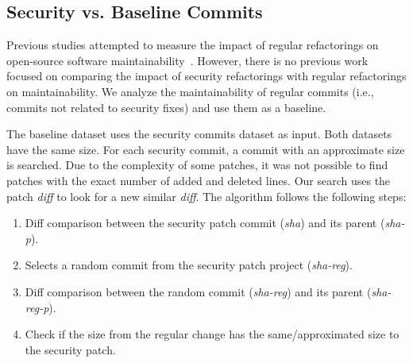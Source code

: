 \documentclass[10pt,conference]{IEEEtran}
\begin{document}
%
\subsection{Security vs. Baseline Commits}
%
Previous studies attempted to measure the impact of regular refactorings on
open-source software maintainability~\cite{HEGEDUS2018313}. However, there is no
previous work focused on comparing the impact of security refactorings with
regular refactorings on maintainability.
We analyze the maintainability of regular commits (i.e., commits not related
to security fixes) and use them as a baseline.

The baseline dataset uses the security commits dataset as input.
Both datasets have the same size. For each
security commit, a commit with an approximate size is searched. Due to the complexity 
of some patches, it was not possible to find patches with the exact number of added and 
deleted lines. Our search uses the patch \emph{diff} to look for a new similar \emph{diff}. The algorithm follows the following steps:

\begin{enumerate}
\item Diff comparison between the security patch commit (\emph{sha}) and its parent (\emph{sha-p}).
\item Selects a random commit from the security patch project (\emph{sha-reg}).
\item Diff comparison between the random commit (\emph{sha-reg}) and its parent (\emph{sha-reg-p}).
\item Check if the size from the regular change has the same/approximated size to 
the security patch.
\end{enumerate}
\end{document}
